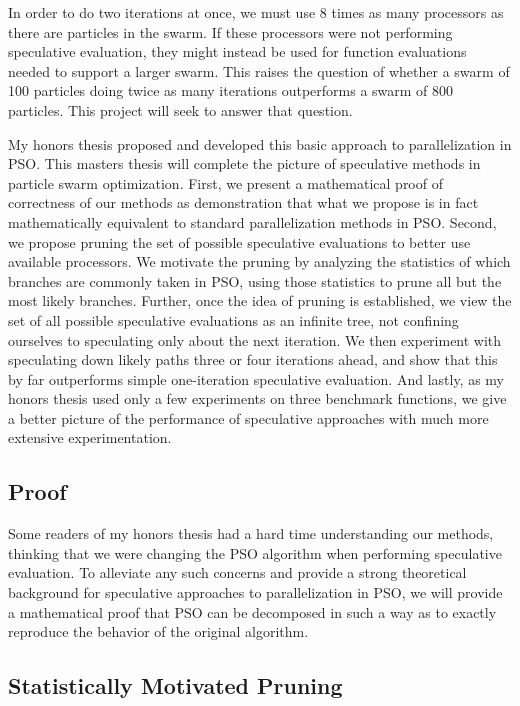 \documentclass[ms]{byuprop}
\begin{document}
In order to do two iterations at once, we must use 8 times as many processors
as there are particles in the swarm.  If these processors were not performing
speculative evaluation, they might instead be used for function evaluations
needed to support a larger swarm.  This raises the question of whether a swarm
of 100 particles doing twice as many iterations outperforms a swarm of 800
particles.  This project will seek to answer that question.

My honors thesis proposed and developed this basic approach to parallelization
in PSO.  This masters thesis will complete the picture of speculative methods
in particle swarm optimization.  First, we present a mathematical proof of
correctness of our methods as demonstration that what we propose is in fact
mathematically equivalent to standard parallelization methods in PSO.  Second,
we propose pruning the set of possible speculative evaluations to better use
available processors.  We motivate the pruning by analyzing the statistics of
which branches are commonly taken in PSO, using those statistics to prune all
but the most likely branches.  Further, once the idea of pruning is
established, we view the set of all possible speculative evaluations as an
infinite tree, not confining ourselves to speculating only about the next
iteration.  We then experiment with speculating down likely paths three or four
iterations ahead, and show that this by far outperforms simple one-iteration
speculative evaluation.  And lastly, as my honors thesis used only a few
experiments on three benchmark functions, we give a better picture of the
performance of speculative approaches with much more extensive experimentation.

\subsection{Proof}

Some readers of my honors thesis had a hard time understanding our methods,
thinking that we were changing the PSO algorithm when performing speculative
evaluation.  To alleviate any such concerns and provide a strong theoretical
background for speculative approaches to parallelization in PSO, we will
provide a mathematical proof that PSO can be decomposed in such a way as to
exactly reproduce the behavior of the original algorithm.

\subsection{Statistically Motivated Pruning}
\end{document}
